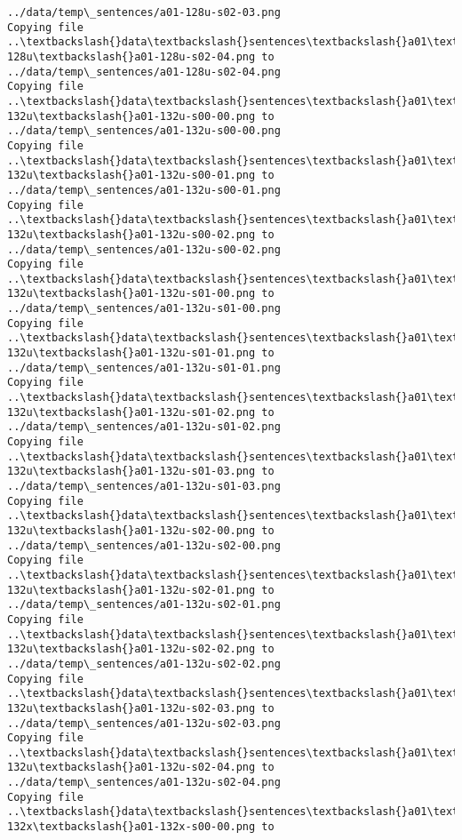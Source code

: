 \documentclass[11pt]{article}
\begin{document}
\begin{Verbatim}[commandchars=\\\{\}]
../data/temp\_sentences/a01-128u-s02-03.png
Copying file ..\textbackslash{}data\textbackslash{}sentences\textbackslash{}a01\textbackslash{}a01-128u\textbackslash{}a01-128u-s02-04.png to
../data/temp\_sentences/a01-128u-s02-04.png
Copying file ..\textbackslash{}data\textbackslash{}sentences\textbackslash{}a01\textbackslash{}a01-132u\textbackslash{}a01-132u-s00-00.png to
../data/temp\_sentences/a01-132u-s00-00.png
Copying file ..\textbackslash{}data\textbackslash{}sentences\textbackslash{}a01\textbackslash{}a01-132u\textbackslash{}a01-132u-s00-01.png to
../data/temp\_sentences/a01-132u-s00-01.png
Copying file ..\textbackslash{}data\textbackslash{}sentences\textbackslash{}a01\textbackslash{}a01-132u\textbackslash{}a01-132u-s00-02.png to
../data/temp\_sentences/a01-132u-s00-02.png
Copying file ..\textbackslash{}data\textbackslash{}sentences\textbackslash{}a01\textbackslash{}a01-132u\textbackslash{}a01-132u-s01-00.png to
../data/temp\_sentences/a01-132u-s01-00.png
Copying file ..\textbackslash{}data\textbackslash{}sentences\textbackslash{}a01\textbackslash{}a01-132u\textbackslash{}a01-132u-s01-01.png to
../data/temp\_sentences/a01-132u-s01-01.png
Copying file ..\textbackslash{}data\textbackslash{}sentences\textbackslash{}a01\textbackslash{}a01-132u\textbackslash{}a01-132u-s01-02.png to
../data/temp\_sentences/a01-132u-s01-02.png
Copying file ..\textbackslash{}data\textbackslash{}sentences\textbackslash{}a01\textbackslash{}a01-132u\textbackslash{}a01-132u-s01-03.png to
../data/temp\_sentences/a01-132u-s01-03.png
Copying file ..\textbackslash{}data\textbackslash{}sentences\textbackslash{}a01\textbackslash{}a01-132u\textbackslash{}a01-132u-s02-00.png to
../data/temp\_sentences/a01-132u-s02-00.png
Copying file ..\textbackslash{}data\textbackslash{}sentences\textbackslash{}a01\textbackslash{}a01-132u\textbackslash{}a01-132u-s02-01.png to
../data/temp\_sentences/a01-132u-s02-01.png
Copying file ..\textbackslash{}data\textbackslash{}sentences\textbackslash{}a01\textbackslash{}a01-132u\textbackslash{}a01-132u-s02-02.png to
../data/temp\_sentences/a01-132u-s02-02.png
Copying file ..\textbackslash{}data\textbackslash{}sentences\textbackslash{}a01\textbackslash{}a01-132u\textbackslash{}a01-132u-s02-03.png to
../data/temp\_sentences/a01-132u-s02-03.png
Copying file ..\textbackslash{}data\textbackslash{}sentences\textbackslash{}a01\textbackslash{}a01-132u\textbackslash{}a01-132u-s02-04.png to
../data/temp\_sentences/a01-132u-s02-04.png
Copying file ..\textbackslash{}data\textbackslash{}sentences\textbackslash{}a01\textbackslash{}a01-132x\textbackslash{}a01-132x-s00-00.png to

\end{Verbatim}
\end{document}
